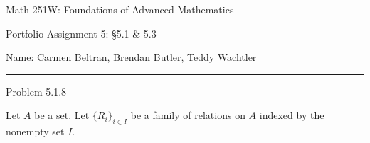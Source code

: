 \documentclass{article}
\theoremstyle{definition}
\begin{document}
	\begin{center}
		\Large{Math 251W: Foundations of Advanced Mathematics}
		\vspace{0.1cm}

		\normalsize Portfolio Assignment 5: \S 5.1 \& 5.3
		\vspace{0.1cm}

		\hfill Name: Carmen Beltran, Brendan Butler, Teddy Wachtler
		\vspace{0.1cm}

		\hrule
		\vspace{0.5cm}
	\end{center}


	\noindent Problem 5.1.8
	\vspace{0.2cm}

	Let $A$ be a set.
	Let $\{R_i\}_{i \in I}$ be a family of relations on $A$ indexed by the nonempty set $I$.
\end{document}
